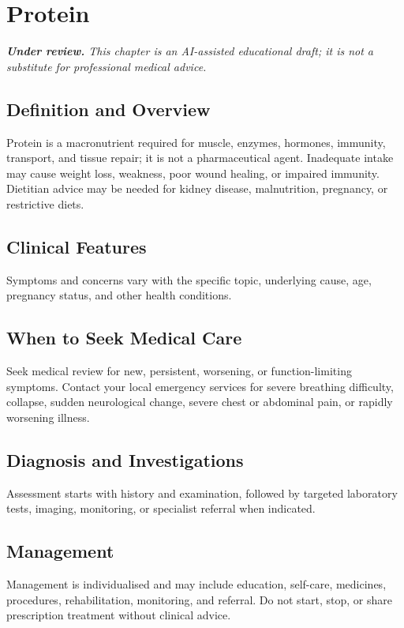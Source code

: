 \chapter{Protein}

\medskip
\noindent\textit{\textbf{Under review.} This chapter is an AI-assisted educational draft; it is not a substitute for professional medical advice.}

\section*{Definition and Overview}
Protein is a macronutrient required for muscle, enzymes, hormones, immunity, transport, and tissue repair; it is not a pharmaceutical agent. Inadequate intake may cause weight loss, weakness, poor wound healing, or impaired immunity. Dietitian advice may be needed for kidney disease, malnutrition, pregnancy, or restrictive diets.

\section*{Clinical Features}
Symptoms and concerns vary with the specific topic, underlying cause, age, pregnancy status, and other health conditions.

\section*{When to Seek Medical Care}
Seek medical review for new, persistent, worsening, or function-limiting symptoms. Contact your local emergency services for severe breathing difficulty, collapse, sudden neurological change, severe chest or abdominal pain, or rapidly worsening illness.

\section*{Diagnosis and Investigations}
Assessment starts with history and examination, followed by targeted laboratory tests, imaging, monitoring, or specialist referral when indicated.

\section*{Management}
Management is individualised and may include education, self-care, medicines, procedures, rehabilitation, monitoring, and referral. Do not start, stop, or share prescription treatment without clinical advice.

